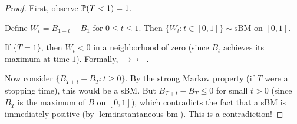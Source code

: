 \begin{proof}
    First, observe $\mathbb{P}(T < 1) = 1$.

    Define $W_t = B_{1-t} - B_1$ for $0 \leq t \leq 1$. Then $\{W_t : t \in [0,1]\} \sim \mathrm{sBM}$ on $[0,1]$.

    If $\{T = 1\}$, then $W_t < 0$ in a neighborhood of zero (since $B_t$ achieves its maximum at time $1$). Formally, $\to \leftarrow$.

    Now consider $\{B_{T+t} - B_T : t \geq 0\}$. By the strong Markov property (if $T$ were a stopping time), this would be a sBM. But $B_{T+t} - B_T \leq 0$ for small $t > 0$ (since $B_T$ is the maximum of $B$ on $[0,1]$), which contradicts the fact that a sBM is immediately positive (by \cref{lem:instantaneous-bm}). This is a contradiction!
\end{proof}
